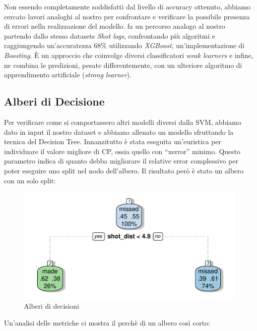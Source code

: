 \par
Non essendo completamente soddisfatti dal livello di accuracy ottenuto, abbiamo cercato lavori analoghi al nostro per confrontare e verificare la possibile presenza di errori nella realizzazione del modello. \cite{predictingNBAst} fa un percorso analogo al nostro partendo dallo stesso datasets \textit{Shot logs}, confrontando più algoritmi e raggiungendo un'accuratezza  68\% utilizzando \textit{XGBoost}, un'implementazione di \textit{Boosting}. È un approccio che coinvolge diversi classificatori \textit{weak learners} e infine, ne combina le predizioni, pesate differentemente, con un ulteriore algoritmo di apprendimento artificiale (\textit{strong learner}).

\subsection{Alberi di Decisione}
Per verificare come si comportassero altri modelli diversi dalla SVM, abbiamo dato in input il nostro dataset e abbiamo allenato un modello sfruttando la tecnica del Decision Tree.
Innanzitutto è stata eseguita un’euristica per individuare il valore migliore di CP, ossia quello con “xerror” minimo. Questo parametro indica di quanto debba migliorare il relative error complessivo per poter eseguire uno split nel nodo dell'albero.
Il risultato però è stato un albero con un solo split:

\begin{figure}
\caption{Alberi di decisioni}
\label{dt_fig}
  \includegraphics[width=\linewidth]{DECISIONTREE}
\end{figure}


Un’analisi delle metriche ci mostra il perchè di un albero così corto:

